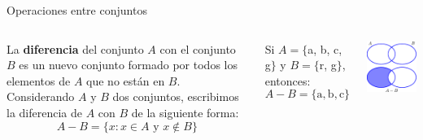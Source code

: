 \documentclass[9pt, aspectratio=169]{beamer}
\begin{document}
\begin{frame}{Operaciones entre conjuntos}
\begin{columns}[c]
\cx
\begin{definition}
    La \textbf{diferencia} del conjunto $A$ con el conjunto $B$ es un nuevo conjunto formado por todos los elementos de $A$ que no están en $B$. Considerando $A$ y $B$ dos conjuntos, escribimos la diferencia de $A$ con $B$ de la siguiente forma:
    \[ A - B = \{ x : x \in A \text{ y } x \notin B \} \]
\end{definition}

\begin{example}
    Si $A = \{$a, b, c, g$\}$ y $B = \{$r, g$\}$, entonces:
    \[ A - B = \{\text{a}, \text{b}, \text{c} \} \]
\end{example}

\cx
\begin{center}
    \includegraphics[scale=1.0]{figs/fig-05.pdf}
\end{center}
\end{columns}
\end{frame}
\end{document}
